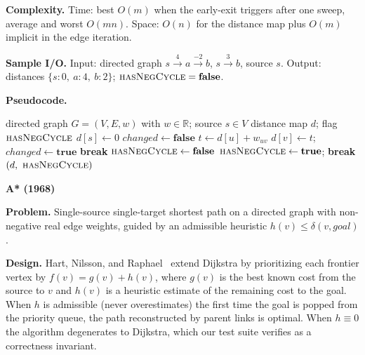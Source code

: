 \documentclass[12pt]{article}
\begin{document}
\textbf{Complexity.} Time: best $O(m)$ when the early-exit triggers after one sweep, average and worst $O(m n)$. Space: $O(n)$ for the distance map plus $O(m)$ implicit in the edge iteration.
\medskip

\textbf{Sample I/O.} Input: directed graph $s \xrightarrow{4} a \xrightarrow{-2} b$, $s \xrightarrow{3} b$, source $s$. Output: distances $\{s : 0,\ a : 4,\ b : 2\}$; $\textsc{hasNegCycle} = \mathbf{false}$.

\newpage
\noindent\textbf{Pseudocode.}

\begin{algorithm}[H]
\caption{Bellman--Ford}
\begin{algorithmic}[1]
\Require directed graph $G = (V, E, w)$ with $w \in \mathbb{R}$; source $s \in V$
\Ensure distance map $d$; flag $\textsc{hasNegCycle}$
\State $d[s] \gets 0$
  \State $\mathit{changed} \gets \mathbf{false}$
      \State $t \gets d[u] + w_{uv}$
        \State $d[v] \gets t$; $\mathit{changed} \gets \mathbf{true}$
      \EndIf
    \EndIf
  \EndFor
   \State \textbf{break} 
  \EndIf
\EndFor
\State $\textsc{hasNegCycle} \gets \mathbf{false}$
    \State $\textsc{hasNegCycle} \gets \mathbf{true}$; \textbf{break}
  \EndIf
\EndFor
\State \Return $(d,\ \textsc{hasNegCycle})$
\end{algorithmic}
\end{algorithm}

\newpage
\noindent\textbf{A* (1968)}\label{sec:algo-astar}
\medskip

\textbf{Problem.} Single-source single-target shortest path on a directed graph with non-negative real edge weights, guided by an admissible heuristic $h(v) \le \delta(v, \mathit{goal})$.
\medskip

\textbf{Design.} Hart, Nilsson, and Raphael~\cite{hart1968astar} extend Dijkstra by prioritizing each frontier vertex by $f(v) = g(v) + h(v)$, where $g(v)$ is the best known cost from the source to $v$ and $h(v)$ is a heuristic estimate of the remaining cost to the goal. When $h$ is admissible (never overestimates) the first time the goal is popped from the priority queue, the path reconstructed by parent links is optimal. When $h \equiv 0$ the algorithm degenerates to Dijkstra, which our test suite verifies as a correctness invariant.
\medskip
\end{document}
